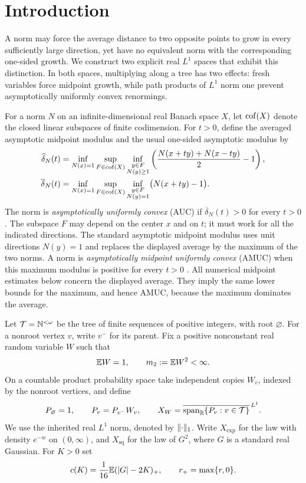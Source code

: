 \section{Introduction}

A norm may force the average distance to two opposite points to grow in
every sufficiently large direction, yet have no equivalent norm with the
corresponding one-sided growth. We construct two explicit real $L^1$
spaces that exhibit this distinction. In both spaces, multiplying along a
tree has two effects: fresh variables force midpoint growth, while path
products of $L^1$ norm one prevent asymptotically uniformly convex
renormings.

For a norm $N$ on an infinite-dimensional real Banach space $X$, let
$\operatorname{cof}(X)$ denote the closed linear subspaces of finite codimension. For
$t>0$, define the averaged asymptotic midpoint modulus and the usual
one-sided asymptotic modulus \cite[Section~2.1]{JLPS2002} by
\begin{align*}
 \widehat\delta_N(t)
 &=\inf_{N(x)=1}\sup_{F\in\operatorname{cof}(X)}
   \inf_{\substack{y\in F\\N(y)\ge1}}
   \left(\frac{N(x+ty)+N(x-ty)}2-1\right),\\
 \overline\delta_N(t)
 &=\inf_{N(x)=1}\sup_{F\in\operatorname{cof}(X)}
   \inf_{\substack{y\in F\\N(y)=1}}\bigl(N(x+ty)-1\bigr).
\end{align*}
The norm is \emph{asymptotically uniformly convex} (AUC) if
$\overline\delta_N(t)>0$ for every $t>0$. The subspace $F$ may depend
on the center $x$ and on $t$; it must work for all the indicated directions.
The standard asymptotic midpoint modulus uses unit directions $N(y)=1$
and replaces the displayed average by the maximum of the two norms.
A norm is \emph{asymptotically midpoint
uniformly convex} (AMUC) when this maximum modulus is positive for every
$t>0$ \cite[Definition~2.2]{DKRRZ2016}. All numerical midpoint estimates
below concern the displayed average. They imply the same lower bounds
for the maximum, and hence AMUC, because the maximum dominates the average.

Let $\mathcal T=\mathbb N^{<\omega}$ be the tree of finite sequences of positive
integers, with root $\varnothing$. For a nonroot vertex $v$, write $v^-$
for its parent. Fix a positive nonconstant real random variable $W$ such
that
\[
 \mathbb E W=1,\qquad m_2:=\mathbb E W^2<\infty.
\]
On a countable product probability space take independent copies $W_v$,
indexed by the nonroot vertices, and define
\[
 P_{\varnothing}=1,\qquad P_v=P_{v^-}W_v,
 \qquad X_W=
 \overline{\operatorname{span}_{\mathbb R}\{P_v:v\in\mathcal T\}}^{\,L^1}.
\]
We use the inherited real $L^1$ norm, denoted by $\lVert \cdot\rVert_1$.
Write $X_{\mathrm{exp}}$ for the law with density $e^{-w}$ on $(0,\infty)$,
and $X_{\mathrm{sq}}$ for the law of $G^2$, where $G$ is a standard real
Gaussian. For $K>0$ set
\[
 c(K)=\frac1{16}\mathbb E(|G|-2K)_+,\qquad r_+=\max\{r,0\}.
\]

